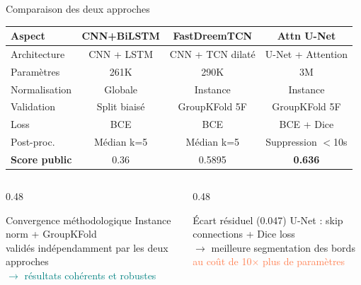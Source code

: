 \documentclass[aspectratio=169, 10pt]{beamer}
\begin{document}
\begin{frame}{Comparaison des deux approches}
    \small
    \begin{tabular}{@{}lccc@{}}
        \toprule
        \textbf{Aspect} & \textbf{CNN+BiLSTM} & \textbf{FastDreemTCN} & \textbf{Attn U-Net} \\
        \midrule
        Architecture      & CNN + LSTM      & CNN + TCN dilaté    & U-Net + Attention \\
        Paramètres        & 261K            & 290K                & 3M \\
        Normalisation     & Globale         & Instance            & Instance \\
        Validation        & Split biaisé    & GroupKFold 5F       & GroupKFold 5F \\
        Loss              & BCE             & BCE                 & BCE + Dice \\
        Post-proc.        & Médian k=5      & Médian k=5          & Suppression $<$10s \\
        \midrule
        \textbf{Score public} & 0.36 & 0.5895 & \textbf{0.636} \\
        \bottomrule
    \end{tabular}
    \vspace{0.25cm}
    \begin{columns}[T]
        \begin{column}{0.48\textwidth}
            \begin{block}{\small Convergence méthodologique}
                \small Instance norm + GroupKFold\\
                validés indépendamment par les deux approches\\
                \textcolor{Teal}{$\to$ résultats cohérents et robustes}
            \end{block}
        \end{column}
        \begin{column}{0.48\textwidth}
            \begin{alertblock}{\small Écart résiduel (0.047)}
                \small U-Net : skip connections + Dice loss\\
                $\to$ meilleure segmentation des bords\\
                \textcolor{Coral}{au coût de 10$\times$ plus de paramètres}
            \end{alertblock}
        \end{column}
    \end{columns}
\end{frame}
\end{document}
